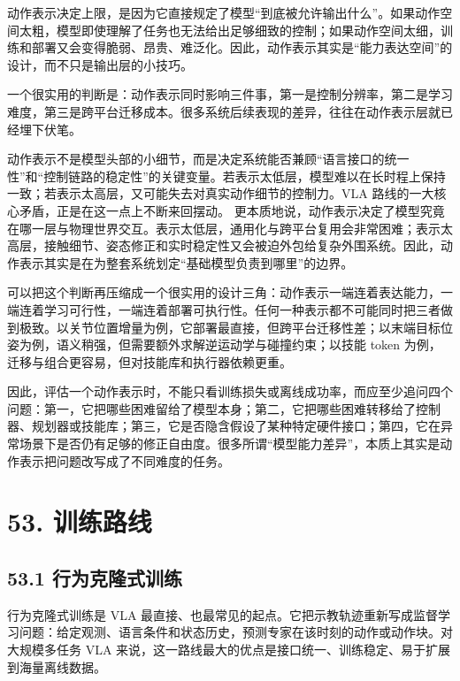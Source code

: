 动作表示决定上限，是因为它直接规定了模型“到底被允许输出什么”。如果动作空间太粗，模型即使理解了任务也无法给出足够细致的控制；如果动作空间太细，训练和部署又会变得脆弱、昂贵、难泛化。因此，动作表示其实是“能力表达空间”的设计，而不只是输出层的小技巧。

一个很实用的判断是：动作表示同时影响三件事，第一是控制分辨率，第二是学习难度，第三是跨平台迁移成本。很多系统后续表现的差异，往往在动作表示层就已经埋下伏笔。

动作表示不是模型头部的小细节，而是决定系统能否兼顾“语言接口的统一性”和“控制链路的稳定性”的关键变量。若表示太低层，模型难以在长时程上保持一致；若表示太高层，又可能失去对真实动作细节的控制力。VLA 路线的一大核心矛盾，正是在这一点上不断来回摆动。 更本质地说，动作表示决定了模型究竟在哪一层与物理世界交互。表示太低层，通用化与跨平台复用会非常困难；表示太高层，接触细节、姿态修正和实时稳定性又会被迫外包给复杂外围系统。因此，动作表示其实是在为整套系统划定“基础模型负责到哪里”的边界。

可以把这个判断再压缩成一个很实用的设计三角：动作表示一端连着表达能力，一端连着学习可行性，一端连着部署可执行性。任何一种表示都不可能同时把三者做到极致。以关节位置增量为例，它部署最直接，但跨平台迁移性差；以末端目标位姿为例，语义稍强，但需要额外求解逆运动学与碰撞约束；以技能 token 为例，迁移与组合更容易，但对技能库和执行器依赖更重。

因此，评估一个动作表示时，不能只看训练损失或离线成功率，而应至少追问四个问题：第一，它把哪些困难留给了模型本身；第二，它把哪些困难转移给了控制器、规划器或技能库；第三，它是否隐含假设了某种特定硬件接口；第四，它在异常场景下是否仍有足够的修正自由度。很多所谓“模型能力差异”，本质上其实是动作表示把问题改写成了不同难度的任务。

\chapter*{53. 训练路线}

\section*{53.1 行为克隆式训练}


行为克隆式训练是 VLA 最直接、也最常见的起点。它把示教轨迹重新写成监督学习问题：给定观测、语言条件和状态历史，预测专家在该时刻的动作或动作块。对大规模多任务 VLA 来说，这一路线最大的优点是接口统一、训练稳定、易于扩展到海量离线数据。

